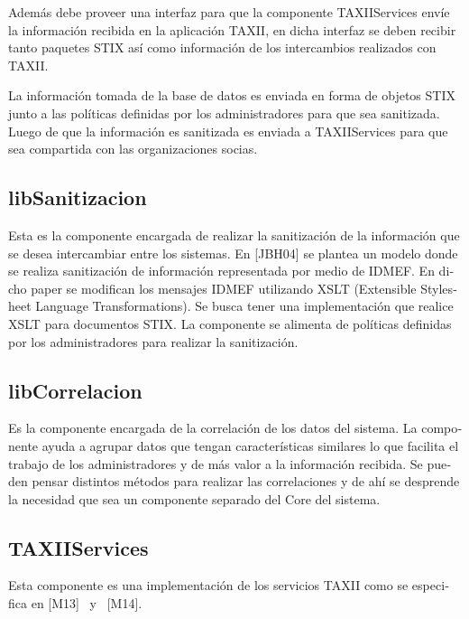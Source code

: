 \documentclass[11pt]{article}
\begin{document}
\foreignlanguage{spanish}{Además debe proveer una interfaz para que la componente TAXIIServices envíe la información
recibida en la aplicación TAXII, en dicha interfaz se deben recibir tanto paquetes STIX así como información de los
intercambios realizados con TAXII. }

\foreignlanguage{spanish}{La información tomada de la base de datos es enviada en forma de objetos STIX junto a las
políticas definidas por los administradores para que sea sanitizada. }\foreignlanguage{spanish}{Luego de que la
información es sanitizada es enviada a TAXIIServices para que sea compartida con las organizaciones socias.}

\subsection[libSanitizacion]{\foreignlanguage{spanish}{libSanitizacion}}
\foreignlanguage{spanish}{Esta es la componente encargada de realizar la sanitización de la información que se desea
intercambiar entre los sistemas. En }\foreignlanguage{spanish}{[JBH04] se plantea un modelo donde se realiza
sanitización de información representada por medio de IDMEF. En dicho paper se modifican los mensajes IDMEF utilizando
XSLT (Extensible Stylesheet Language Transformations). Se busca tener una implementación que realice XSLT para
documentos STIX. La componente se alimenta de políticas definidas por los administradores para realizar la
sanitización.}

\subsection[libCorrelacion]{\foreignlanguage{spanish}{libCorrelacion}}
\foreignlanguage{spanish}{Es la componente encargada de la correlación de los datos del sistema.}%
%
\foreignlanguage{spanish}{ La componente ayuda a agrupar datos que tengan características similares lo que facilita el
trabajo de los administradores y de más valor a la información recibida. Se pueden pensar distintos métodos para
realizar las correlaciones y de ahí se desprende la necesidad que sea un componente separado del Core del sistema.}

\subsection[TAXIIServices]{\foreignlanguage{spanish}{TAXIIServices}}
\foreignlanguage{spanish}{Esta componente es una implementación de los servicios TAXII como se especifica en
}\foreignlanguage{spanish}{[M13] \ y \ [M14]. }
\end{document}
